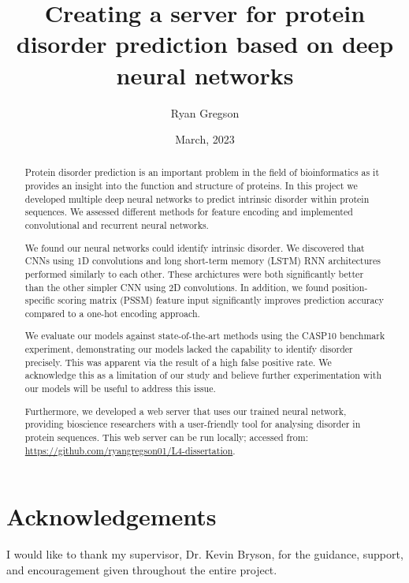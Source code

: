 \documentclass{l4proj}
\begin{document}
\title{Creating a server for protein disorder prediction based on deep neural networks}
\author{Ryan Gregson}
\date{March, 2023}

\maketitle

\begin{abstract}

Protein disorder prediction is an important problem in the field of bioinformatics as it provides an insight into the function and structure of proteins. In this project we developed multiple deep neural networks to predict intrinsic disorder within protein sequences. We assessed different methods for feature encoding and implemented convolutional and recurrent neural networks.

We found our neural networks could identify intrinsic disorder. We discovered that CNNs using 1D convolutions and long short-term memory (LSTM) RNN architectures performed similarly to each other. These archictures were both significantly better than the other simpler CNN using 2D convolutions. In addition, we found position-specific scoring matrix (PSSM) feature input significantly improves prediction accuracy compared to a one-hot encoding approach.

We evaluate our models against state-of-the-art methods using the CASP10 benchmark experiment, demonstrating our models lacked the capability to identify disorder precisely. This was apparent via the result of a high false positive rate. We acknowledge this as a limitation of our study and believe further experimentation with our models will be useful to address this issue.

Furthermore, we developed a web server that uses our trained neural network, providing bioscience researchers with a user-friendly tool for analysing disorder in protein sequences. This web server can be run locally; accessed from: \url{https://github.com/ryangregson01/L4-dissertation}.

\end{abstract}

\chapter*{Acknowledgements}
I would like to thank my supervisor, Dr. Kevin Bryson, for the guidance, support, and encouragement given throughout the entire project.
%
\end{document}
